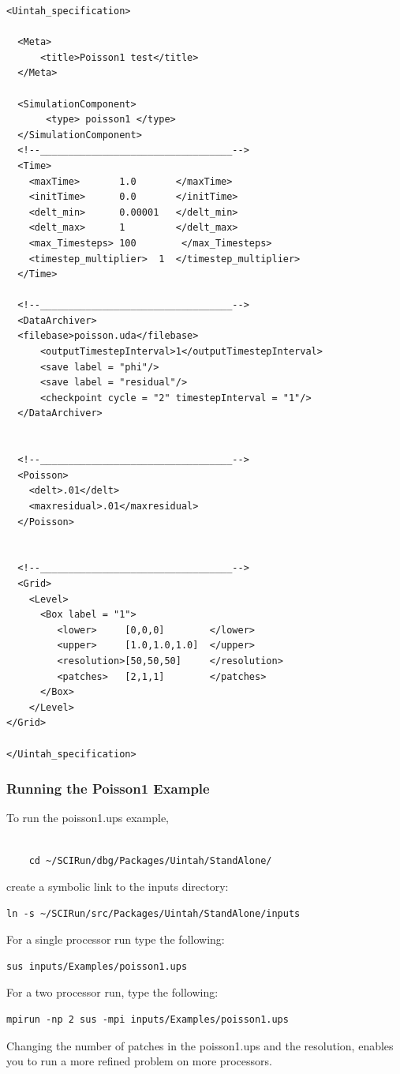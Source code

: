 \documentclass[12pt]{report}
\begin{document}
\begin{Verbatim}[fontsize=\footnotesize]
<Uintah_specification>

  <Meta>
      <title>Poisson1 test</title>
  </Meta>

  <SimulationComponent>
       <type> poisson1 </type>
  </SimulationComponent>
  <!--__________________________________-->
  <Time>
    <maxTime>       1.0       </maxTime>
    <initTime>      0.0       </initTime>
    <delt_min>      0.00001   </delt_min>
    <delt_max>      1         </delt_max>
    <max_Timesteps> 100        </max_Timesteps>
    <timestep_multiplier>  1  </timestep_multiplier>
  </Time>

  <!--__________________________________-->
  <DataArchiver>
  <filebase>poisson.uda</filebase>
      <outputTimestepInterval>1</outputTimestepInterval>
      <save label = "phi"/>
      <save label = "residual"/>
      <checkpoint cycle = "2" timestepInterval = "1"/>
  </DataArchiver>


  <!--__________________________________-->
  <Poisson>
    <delt>.01</delt>
    <maxresidual>.01</maxresidual>
  </Poisson>


  <!--__________________________________-->
  <Grid>
    <Level>
      <Box label = "1">
         <lower>     [0,0,0]        </lower>
         <upper>     [1.0,1.0,1.0]  </upper>
         <resolution>[50,50,50]     </resolution>
         <patches>   [2,1,1]        </patches>
      </Box>
    </Level>
</Grid>

</Uintah_specification>

\end{Verbatim}


\subsubsection{Running the Poisson1 Example}

To run the poisson1.ups example, 
\begin{Verbatim}[fontsize=\footnotesize]

	cd ~/SCIRun/dbg/Packages/Uintah/StandAlone/
\end{Verbatim}

create a symbolic link to the inputs directory:
\begin{Verbatim}[fontsize=\footnotesize]
	ln -s ~/SCIRun/src/Packages/Uintah/StandAlone/inputs
\end{Verbatim}
For a single processor run type the following:
\begin{Verbatim}[fontsize=\footnotesize]
	sus inputs/Examples/poisson1.ups
\end{Verbatim}
For a two processor run, type the following:
\begin{Verbatim}[fontsize=\footnotesize]
	mpirun -np 2 sus -mpi inputs/Examples/poisson1.ups
\end{Verbatim}
Changing the number of patches in the poisson1.ups and the resolution,
enables you to run a more refined problem on more processors.
\end{document}
